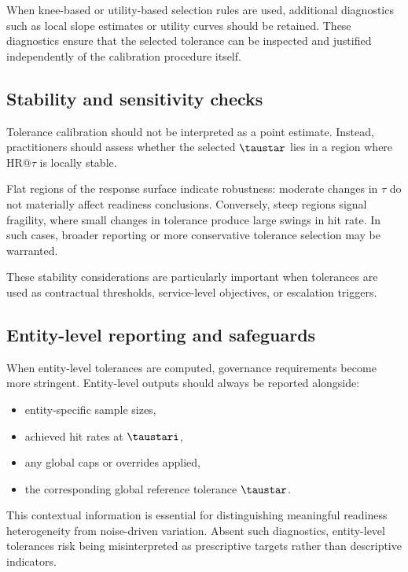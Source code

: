 When knee-based or utility-based selection rules are used, additional diagnostics
such as local slope estimates or utility curves should be retained.
These diagnostics ensure that the selected tolerance can be inspected and
justified independently of the calibration procedure itself.

\subsection{Stability and sensitivity checks}
\label{subsec:stability_checks}

Tolerance calibration should not be interpreted as a point estimate.
Instead, practitioners should assess whether the selected $\taustar$ lies in a
region where HR@$\tau$ is locally stable.

Flat regions of the response surface indicate robustness: moderate changes in
$\tau$ do not materially affect readiness conclusions.
Conversely, steep regions signal fragility, where small changes in tolerance
produce large swings in hit rate.
In such cases, broader reporting or more conservative tolerance selection may be
warranted.

These stability considerations are particularly important when tolerances are
used as contractual thresholds, service-level objectives, or escalation triggers.

\subsection{Entity-level reporting and safeguards}
\label{subsec:entity_reporting}

When entity-level tolerances are computed, governance requirements become more
stringent.
Entity-level outputs should always be reported alongside:
\begin{itemize}[leftmargin=*]
    \item entity-specific sample sizes,
    \item achieved hit rates at $\taustari$,
    \item any global caps or overrides applied,
    \item the corresponding global reference tolerance $\taustar$.
\end{itemize}

This contextual information is essential for distinguishing meaningful readiness
heterogeneity from noise-driven variation.
Absent such diagnostics, entity-level tolerances risk being misinterpreted as
prescriptive targets rather than descriptive indicators.

